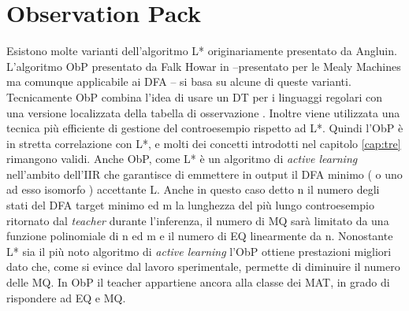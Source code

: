 
\chapter{Observation Pack} %
\label{cap:quattro}
Esistono molte varianti dell'algoritmo L* originariamente presentato da Angluin. L'algoritmo \ac{ObP} presentato da Falk Howar in \cite{Howar12} --presentato per le Mealy Machines ma comunque applicabile ai DFA -- si basa su alcune di queste varianti. Tecnicamente \ac{ObP} combina l'idea di usare un \ac{DT} per i linguaggi regolari \cite{Kearns94} con una versione localizzata della tabella di osservazione \cite{Schapire93}. Inoltre viene utilizzata una tecnica più efficiente di gestione del controesempio rispetto ad L*. Quindi l'\ac{ObP}  è in stretta correlazione con L*, e molti dei concetti introdotti nel capitolo \ref{cap:tre} rimangono validi. Anche \ac{ObP}, come L* è un algoritmo di \textit{active learning} nell'ambito dell'\ac{IIR} che garantisce di emmettere in output il \ac{DFA} minimo ( o uno ad esso isomorfo ) accettante \ac{L}. Anche in questo caso detto n il numero degli stati del DFA target minimo ed m la lunghezza del più lungo controesempio ritornato dal \textit{teacher} durante l'inferenza, il numero di \ac{MQ} sarà limitato da una funzione polinomiale di n ed m e il numero di \ac{EQ} linearmente da n. Nonostante L* sia il più noto algoritmo di \textit{active learning} l'\ac{ObP} ottiene prestazioni migliori dato che, come si evince dal lavoro sperimentale, permette di diminuire il numero delle \ac{MQ}. In \ac{ObP} il teacher appartiene ancora alla classe dei \ac{MAT}, in grado di rispondere ad \ac{EQ} e \ac{MQ}.

